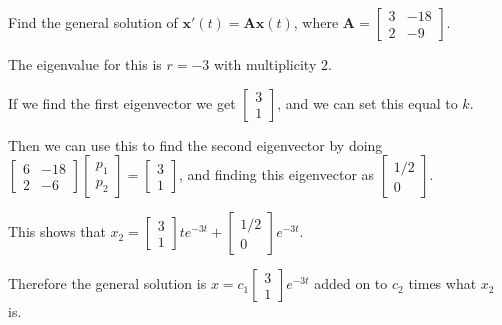 \documentclass[../diffeq.tex]{subfiles}
\begin{document}
\begin{example}
    Find the general solution of $\textbf{x}'(t)=\textbf{Ax}(t)$, where $\textbf{A}=\begin{bmatrix}
        3 & -18\\
        2 & -9
    \end{bmatrix}$.

    The eigenvalue for this is $r=-3$ with multiplicity $2$.

    If we find the first eigenvector we get $\begin{bmatrix}
        3\\1
    \end{bmatrix}$, and we can set this equal to $k$.

    Then we can use this to find the second eigenvector by doing $\begin{bmatrix}
        6 & -18 \\
        2 & -6
    \end{bmatrix}\begin{bmatrix}
        p_1\\p_2
    \end{bmatrix}=\begin{bmatrix}
        3\\1
    \end{bmatrix}$, and finding this eigenvector as $\begin{bmatrix}
        1/2 \\ 0
    \end{bmatrix}$.

    This shows that $x_2=\begin{bmatrix}
        3\\1
    \end{bmatrix}te^{-3t}+\begin{bmatrix}
        1/2 \\ 0 
    \end{bmatrix}e^{-3t}$.

    Therefore the general solution is $x=c_1\begin{bmatrix}
        3\\1
    \end{bmatrix}e^{-3t}$ added on to $c_2$ times what $x_2$ is.
\end{example}
\end{document}
